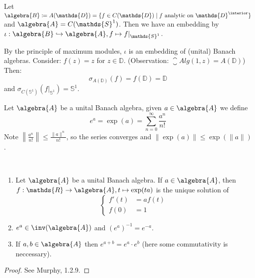\documentclass[a4paper]{article}
\begin{document}
\begin{example}
	Let $\algebra{B} \coloneq A(\mathds{D}) = \{f \in C(\mathds{D}) \mid f \text{ analytic on } \mathds{D}^\interior\}$ and $\algebra{A} = C(\mathds{S}^1)$.
	Then we have an embedding by $\iota: \algebra{B} \hookrightarrow \algebra{A}, f \mapsto f|_{\mathds{S}^1}$.

	By the principle of maximum modules, $\iota$ is an embedding of (unital) Banach algebras.
	Consider: $f(z) = z$ for $z \in \mathds{D}$.
	(Observation: $\closure{Alg}(1,z) = A(\mathds{D})$)
	Then:
	\begin{equation*}
		\sigma_{A(\mathds{D})}(f) = f(\mathds{D}) = \mathds{D}
	\end{equation*}
	and $\sigma_{C(\mathds{S}^1)}(f|_{\mathds{S}^1}) = \mathds{S}^1$.
\end{example}

\begin{definition}[Exponentials]
	Let $\algebra{A}$ be a unital Banach algebra, given $a \in \algebra{A}$ we define
	\begin{equation*}
		e^a = \exp(a) = \sum_{n = 0}^{\infty} \frac{a^n}{n!}
	\end{equation*}
	Note $\left\| \frac{a^n}{n!} \right\| \leq \frac{\|a\|^n}{n!}$, so the series converges and $\| \exp(a) \| \leq \exp(\|a\|)$.
\end{definition}

\begin{theorem}~
	\begin{enumerate}
		\item Let $\algebra{A}$ be a unital Banach algebra. If $a \in \algebra{A}$, then $f: \mathds{R} \to \algebra{A}, t \mapsto \exp(ta)$ is the unique solution of 
		\begin{equation*}
			\left\{ \begin{matrix}
				f'(t) &= a f(t)\\
				f(0) &= 1
			\end{matrix} \right.
		\end{equation*}
		\item $e^a \in \inv(\algebra{A})$ and $(e^a)^{-1} = e^{-a}$.
		\item If $a,b \in \algebra{A}$ then $e^{a + b} = e^a \cdot e^b$ (here some commutativity is neccessary).
	\end{enumerate}
\end{theorem}

\begin{proof}
	See Murphy, 1.2.9.
\end{proof}
\end{document}
